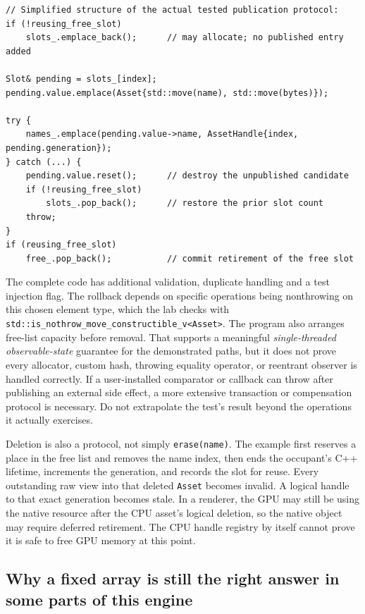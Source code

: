 \begin{verbatim}
// Simplified structure of the actual tested publication protocol:
if (!reusing_free_slot)
    slots_.emplace_back();      // may allocate; no published entry added

Slot& pending = slots_[index];
pending.value.emplace(Asset{std::move(name), std::move(bytes)});

try {
    names_.emplace(pending.value->name, AssetHandle{index, pending.generation});
} catch (...) {
    pending.value.reset();      // destroy the unpublished candidate
    if (!reusing_free_slot)
        slots_.pop_back();      // restore the prior slot count
    throw;
}
if (reusing_free_slot)
    free_.pop_back();           // commit retirement of the free slot
\end{verbatim}

The complete code has additional validation, duplicate handling and a test injection flag. The rollback depends on specific operations being nonthrowing on this chosen element type, which the lab checks with \texttt{std::is\_nothrow\_move\_constructible\_v\textless{}Asset\textgreater{}}. The program also arranges free-list capacity before removal. That supports a meaningful \emph{single-threaded observable-state} guarantee for the demonstrated paths, but it does not prove every allocator, custom hash, throwing equality operator, or reentrant observer is handled correctly. If a user-installed comparator or callback can throw after publishing an external side effect, a more extensive transaction or compensation protocol is necessary. Do not extrapolate the test's result beyond the operations it actually exercises.

Deletion is also a protocol, not simply \texttt{erase(name)}. The example first reserves a place in the free list and removes the name index, then ends the occupant's C++ lifetime, increments the generation, and records the slot for reuse. Every outstanding raw view into that deleted \texttt{Asset} becomes invalid. A logical handle to that exact generation becomes stale. In a renderer, the GPU may still be using the native resource after the CPU asset's logical deletion, so the native object may require deferred retirement. The CPU handle registry by itself cannot prove it is safe to free GPU memory at this point.

\subsection{Why a fixed array is still the right answer in some parts of this engine}\label{05-engine-i-ch005-why-a-fixed-array-is-still-the-right-answer-in-some-parts-of-this-engine}


